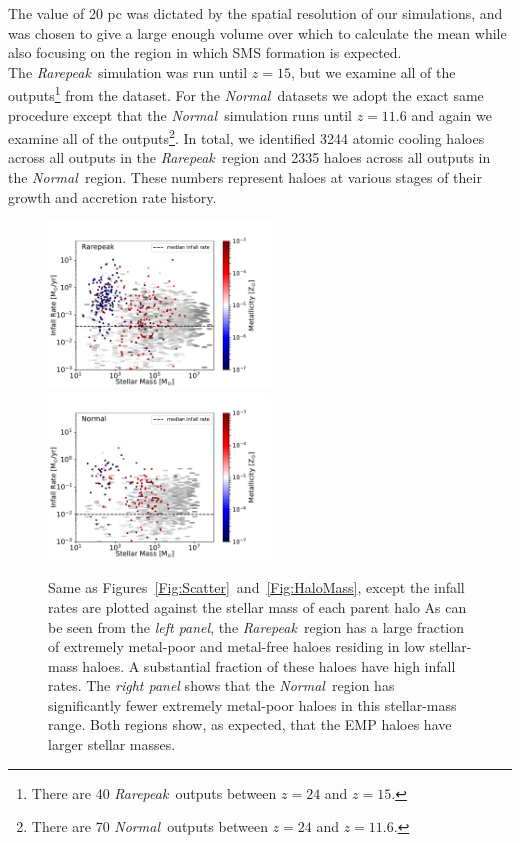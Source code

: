 \documentclass[graphics, twocolumn, usenatbib]{mn2e}
\newcommand{\rarepeak} {\textit{Rarepeak~}}
\newcommand{\normal} {\textit{Normal~}}
\begin{document}
The value of 20 pc was dictated by the spatial resolution of our simulations, and
%
was chosen to give a large enough
volume over which to calculate the mean while also focusing on the region in which SMS formation is
expected. \\
\indent The \rarepeak simulation was run until $z=15$, but we
examine all of the outputs\footnote{There are 40 \rarepeak outputs between $z = 24$ and $z = 15$.}
from the dataset. For the \normal datasets we adopt the exact same procedure except that
the \normal simulation runs until $z = 11.6$ and again we examine all of the
outputs\footnote{There are 70 \normal outputs between $z = 24$ and $z = 11.6$.}.  In total, we identified
3244 atomic cooling haloes across all outputs in the \rarepeak region and 2335
haloes across all outputs in the \normal region. These numbers represent haloes at various stages
of their growth and accretion rate history. 
\begin{figure}
\centering
\begin{minipage}{175mm}      \begin{center} 
\centerline{
\includegraphics[width=0.525\textwidth]{FIGURES/Rarepeak_MdotMstellarZ_Hexbin.pdf}
\includegraphics[width=0.525\textwidth]{FIGURES/Normal_MdotMstellarZ_Hexbin.pdf}}
\caption{Same as Figures~\ref{Fig:Scatter}~and~\ref{Fig:HaloMass}, except
the infall rates are plotted against  the stellar mass of each parent halo 
 As can be seen from the \textit{left panel}, the \rarepeak region has a large fraction of
  extremely metal-poor and metal-free haloes residing in low stellar-mass haloes. A substantial
  fraction of these haloes have high infall rates. 
  The \textit{right panel} shows that the \normal region has significantly fewer extremely metal-poor haloes in this stellar-mass range.
  Both regions show, as expected, that the EMP haloes have larger stellar masses.}
\label{Fig:StellarMass}
\end{center} \end{minipage}

\end{figure}
\end{document}

